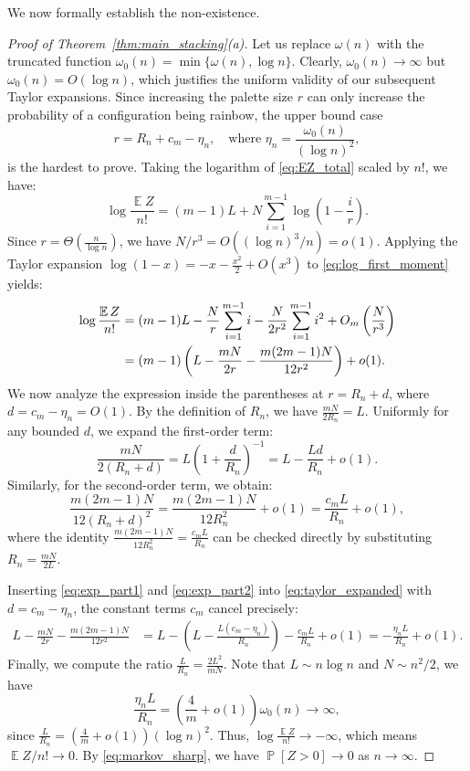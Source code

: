 \documentclass[10pt,a4paper]{amsart}
\newcommand\E{\operatorname{\mathbb{E}}}
\renewcommand\Pr{\operatorname{\mathbb{P}}}
\renewcommand\to{\rightarrow}
\begin{document}
We now formally establish the non-existence.


\begin{proof}[Proof of Theorem~\ref{thm:main_stacking}\textup{(a)}]
Let us replace $\omega(n)$ with the truncated function $\omega_0(n) = \min\{\omega(n), \log n\}$. Clearly, $\omega_0(n) \to \infty$ but $\omega_0(n) = O(\log n)$, which justifies the uniform validity of our subsequent Taylor expansions. Since increasing the palette size $r$ can only increase the probability of a configuration being rainbow, the upper bound case 
\[ r = R_n + c_m - \eta_n, \quad \text{where } \eta_n = \frac{\omega_0(n)}{(\log n)^2}, \]
is the hardest to prove. Taking the logarithm of \eqref{eq:EZ_total} scaled by $n!$, we have:
\begin{equation} \label{eq:log_first_moment}
\log \frac{\E Z}{n!} = (m-1)L + N \sum_{i=1}^{m-1} \log\left(1 - \frac{i}{r}\right).
\end{equation}
Since $r = \Theta\left(\frac{n}{\log n}\right)$, we have $N/r^3 = O((\log n)^3 / n) = o(1)$. Applying the Taylor expansion $\log(1-x) = -x - \frac{x^2}{2} + O(x^3)$ to \eqref{eq:log_first_moment} yields:
\begin{align}
\log \frac{\E Z}{n!} &= (m-1)L - \frac{N}{r}\sum_{i=1}^{m-1} i - \frac{N}{2r^2}\sum_{i=1}^{m-1} i^2 + O_m\left(\frac{N}{r^3}\right) \notag \\
&= (m-1)\left(L - \frac{mN}{2r} - \frac{m(2m-1)N}{12r^2}\right) + o(1). \label{eq:taylor_expanded}
\end{align}
We now analyze the expression inside the parentheses at $r = R_n + d$, where $d = c_m - \eta_n = O(1)$. By the definition of $R_n$, we have $\frac{mN}{2R_n} = L$. Uniformly for any bounded $d$, we expand the first-order term:
\begin{equation} \label{eq:exp_part1}
\frac{mN}{2(R_n + d)} = L \left(1 + \frac{d}{R_n}\right)^{-1} = L - \frac{Ld}{R_n} + o(1).
\end{equation}
Similarly, for the second-order term, we obtain:
\begin{equation} \label{eq:exp_part2}
\frac{m(2m-1)N}{12(R_n+d)^2} = \frac{m(2m-1)N}{12R_n^2} + o(1) = \frac{c_m L}{R_n} + o(1),
\end{equation}
where the identity $\frac{m(2m-1)N}{12R_n^2} = \frac{c_m L}{R_n}$ can be checked directly by substituting $R_n = \frac{mN}{2L}$. 

Inserting \eqref{eq:exp_part1} and \eqref{eq:exp_part2} into \eqref{eq:taylor_expanded} with $d = c_m - \eta_n$, the constant terms $c_m$ cancel precisely:
\begin{align*}
L - \frac{mN}{2r} - \frac{m(2m-1)N}{12r^2} &= L - \left(L - \frac{L(c_m - \eta_n)}{R_n}\right) - \frac{c_m L}{R_n} + o(1)= -\frac{\eta_n L}{R_n} + o(1).
\end{align*}
Finally, we compute the ratio $\frac{L}{R_n} = \frac{2L^2}{mN}$. Note that $L \sim n\log n$ and $N \sim n^2/2$, we have
\[ \frac{\eta_n L}{R_n} = \left(\frac{4}{m} + o(1)\right) \omega_0(n) \to \infty, \]
since $\frac{L}{R_n} = \left(\frac{4}{m} + o(1)\right) (\log n)^2$. Thus, $\log \frac{\E Z}{n!} \to -\infty$, which means $\E Z / n! \to 0$. By \eqref{eq:markov_sharp}, we have $\Pr[Z > 0] \to 0$ as $n \to \infty$.
\end{proof}
\end{document}
